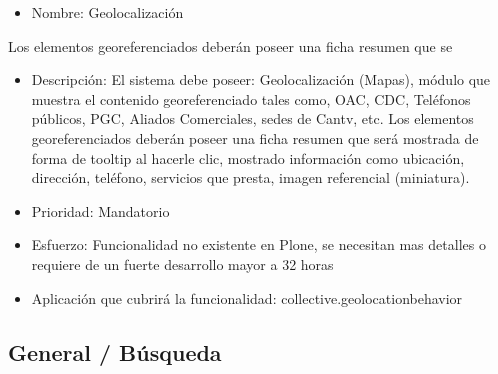 \documentclass[11pt, letterpaper, oneside, spanish]{scrbook}
\begin{document}
\begin{itemize}
\item Nombre: Geolocalización
\end{itemize}
Los elementos georeferenciados deberán poseer una ficha resumen que se
\begin{itemize}
\item Descripción: El sistema debe poseer: Geolocalización (Mapas), módulo que
  muestra el contenido georeferenciado tales como, OAC, CDC, Teléfonos
  públicos, PGC, Aliados Comerciales, sedes de Cantv, etc. Los elementos
  georeferenciados deberán poseer una ficha resumen que será mostrada de forma
  de tooltip al hacerle clic, mostrado información como ubicación, dirección,
  teléfono, servicios que presta, imagen referencial (miniatura).
\item Prioridad: Mandatorio
\item Esfuerzo: Funcionalidad no existente en Plone, se necesitan mas detalles o
  requiere de un fuerte desarrollo mayor a 32 horas
\item Aplicación que cubrirá la funcionalidad: collective.geolocationbehavior
\end{itemize}
\subsection{General / Búsqueda}
\label{sec-2-1-41}
\end{document}
